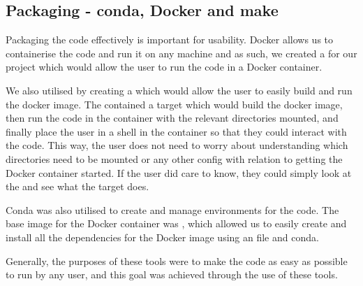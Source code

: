     \subsection{Packaging - conda, Docker and make}\label{subsec:packaging}
    Packaging the code effectively is important for usability.
    Docker allows us to containerise the code and run it on any machine and as such, we created a 
    for our project which would allow the user to run the code in a Docker container.

    We also utilised  by creating a  which would allow the user to easily build
    and run the docker image.
    The  contained a  target which would build the docker image, then run
    the code in the container with the relevant directories mounted, and finally place the user in a shell in the container
    so that they could interact with the code.
    This way, the user does not need to worry about understanding which directories need to be mounted or any other
    config with relation to getting the Docker container started.
    If the user did care to know, they could simply look at the  and see what the 
    target does.

    Conda was also utilised to create and manage environments for the code.
    The base image for the Docker container was , which allowed us to easily create
    and install all the dependencies for the Docker image using an  file and conda.

    Generally, the purposes of these tools were to make the code as easy as possible to run by any user, and
    this goal was achieved through the use of these tools.
